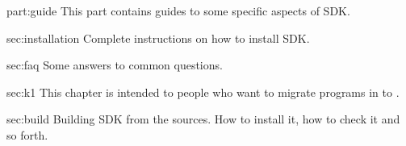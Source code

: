 \begin{partDescription}{part:guide}
  {
    This part contains guides to some specific aspects of \urbi SDK.
  }
\item[sec:installation]
  Complete instructions on how to install \urbi SDK.
\item[sec:faq]
  Some answers to common questions.
\item[sec:k1] This chapter is intended to people who want to migrate
  programs in  to .
\item[sec:build] Building \urbi SDK from the sources.  How to install
  it, how to check it and so forth.
\end{partDescription}

